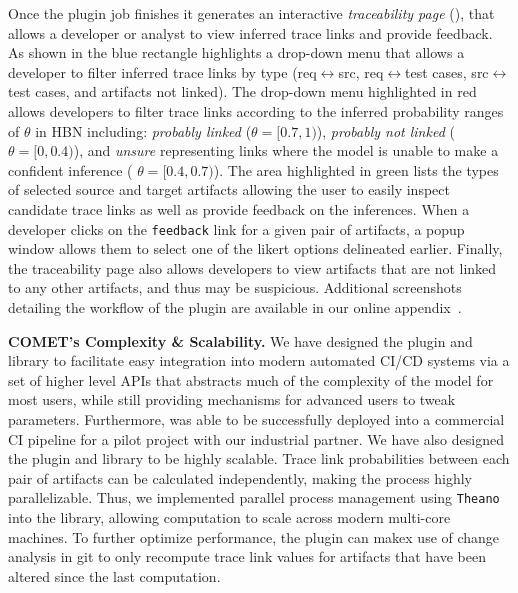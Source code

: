 Once the plugin job finishes it generates an interactive \textit{traceability page} (), that allows a developer or analyst to view inferred trace links and provide feedback. As shown in  the blue rectangle highlights a drop-down menu that allows a developer to filter inferred trace links by type (\ie req$\leftrightarrow$src, req$\leftrightarrow$test cases, src$\leftrightarrow$test cases, and artifacts not linked). The drop-down menu highlighted in red allows developers to filter trace links according to the inferred probability ranges of $\theta$ in \Comets HBN including: \textit{probably linked} (\ie  $\theta=[0.7,1)$), \textit{probably not linked} (\ie $\theta=[0,0.4)$), and \textit{unsure} representing links where the model is unable to make a confident inference ( \ie $\theta=[0.4,0.7)$). The area highlighted in green lists the types of selected source and target artifacts allowing the user to easily inspect candidate trace links as well as provide feedback on the inferences. When a developer clicks on the \texttt{\small feedback} link for a given pair of artifacts, a popup window allows them to select one of the likert options delineated earlier. Finally, the traceability page also allows developers to view artifacts that are not linked to any other artifacts, and thus may be suspicious. Additional screenshots detailing the workflow of the \Comet plugin are available in our online appendix~\citep{appendix}.

\textbf{\textbf{C{\footnotesize OMET}'s Complexity \& Scalability.}} We have designed the \Comet plugin and library to facilitate easy integration into modern automated CI/CD systems via a set of higher level APIs that abstracts much of the complexity of the model for most users, while still providing mechanisms for advanced users to tweak parameters. Furthermore, \Comet was able to be successfully deployed into a commercial CI pipeline for a pilot project with our industrial partner. We have also designed the \Comet plugin and library to be highly scalable. Trace link probabilities between each pair of artifacts can be calculated independently, making the process highly parallelizable. Thus, we implemented parallel process management using \texttt{Theano}~\citep{theano} into the \Comet library, allowing computation to scale across modern multi-core machines. To further optimize performance, the \Comet plugin can makex use of change analysis in git to only recompute trace link values for artifacts that have been altered since the last computation.

